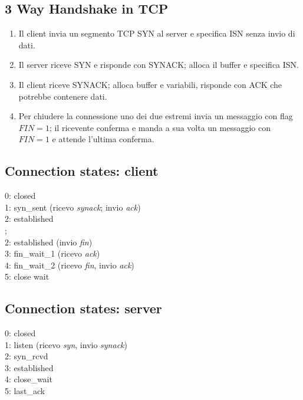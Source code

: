 \subsection{3 Way Handshake in TCP}
\begin{enumerate}
	\item Il client invia un segmento TCP SYN al server e specifica ISN senza invio di dati.
	\item Il server riceve SYN e risponde con SYNACK; alloca il buffer e specifica ISN.
	\item Il client riceve SYNACK; alloca buffer e variabili, risponde con ACK che potrebbe contenere dati.
	\item Per chiudere la connessione uno dei due estremi invia un messaggio con flag $ FIN=1 $; il ricevente conferma e manda a sua volta un messaggio con $ FIN=1 $ e attende l'ultima conferma.
\end{enumerate}

\subsection{Connection states: client}
0: closed\\
1: syn\_sent		(ricevo \textit{synack}; invio \textit{ack})\\
2: established\\
	;\\
2: established		(invio \textit{fin})\\
3: fin\_wait\_1		(ricevo \textit{ack})\\
4: fin\_wait\_2		(ricevo \textit{fin}, invio \textit{ack})\\
5: close wait\\

\subsection{Connection states: server}
0: closed\\
1: listen			(ricevo \textit{syn}, invio \textit{synack})\\
2: syn\_rcvd\\
3: established\\
4: close\_wait\\
5: last\_ack\\

